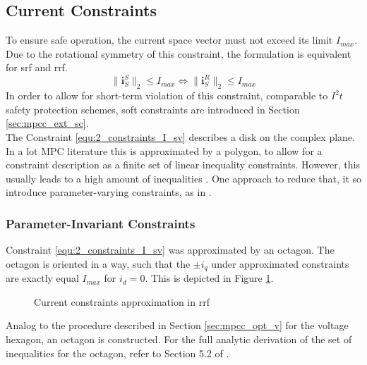 \subsection{Current Constraints}
To ensure safe operation, the current space vector must not exceed its limit $I_{max}$. Due to the rotational symmetry of this constraint, the formulation is equivalent for \acrshort{srf} and \acrshort{rrf}. 
\begin{equation}
	\|\bm{i}_S^S\|_2 \le I_{max} \iff \|\bm{i}_S^R\|_2 \le I_{max}
	\label{equ:2_constraints_I_sv}
\end{equation}
In order to allow for short-term violation of this constraint, comparable to $I^2t$ safety protection schemes, soft constraints are introduced in Section \ref{sec:mpcc_ext_sc}.\\
The Constraint \ref{equ:2_constraints_I_sv} describes a disk on the complex plane. In a lot MPC literature
this is approximated by a polygon, to allow for a constraint description as a finite set of linear inequality constraints. However, this usually leads to a high amount of inequalities \cite{NeunerMA}.  %
One approach to reduce that, it so introduce parameter-varying constraints, as in \cite{TOMPFC1}.
\subsubsection{Parameter-Invariant Constraints}
Constraint \eqref{equ:2_constraints_I_sv} was approximated by an octagon. The octagon is oriented in a way, such that the $\pm i_{q}$ under approximated constraints are exactly equal $I_{max}$ for $i_d = 0$. This is depicted in Figure \ref{fig:2_RRF_octagon}.
\begin{figure}
	\centering
	
	\caption{Current constraints approximation in \acrshort{rrf}}
	\label{fig:2_RRF_octagon}
\end{figure}
Analog to the procedure described in Section \ref{sec:mpcc_opt_v} for the voltage hexagon, an octagon is constructed. For the full analytic derivation of the set of inequalities for the octagon, refer to Section 5.2 of \cite{NeunerMA}.

